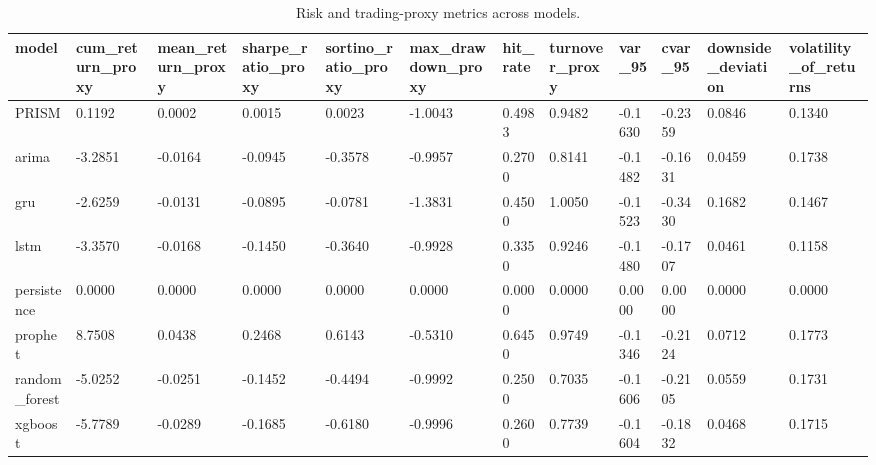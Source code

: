 \begin{table}[htbp]
\centering
\begin{tabular}{llllllllllll}
\hline
model & cum_return_proxy & mean_return_proxy & sharpe_ratio_proxy & sortino_ratio_proxy & max_drawdown_proxy & hit_rate & turnover_proxy & var_95 & cvar_95 & downside_deviation & volatility_of_returns \\
\hline
PRISM & 0.1192 & 0.0002 & 0.0015 & 0.0023 & -1.0043 & 0.4983 & 0.9482 & -0.1630 & -0.2359 & 0.0846 & 0.1340 \\
arima & -3.2851 & -0.0164 & -0.0945 & -0.3578 & -0.9957 & 0.2700 & 0.8141 & -0.1482 & -0.1631 & 0.0459 & 0.1738 \\
gru & -2.6259 & -0.0131 & -0.0895 & -0.0781 & -1.3831 & 0.4500 & 1.0050 & -0.1523 & -0.3430 & 0.1682 & 0.1467 \\
lstm & -3.3570 & -0.0168 & -0.1450 & -0.3640 & -0.9928 & 0.3350 & 0.9246 & -0.1480 & -0.1707 & 0.0461 & 0.1158 \\
persistence & 0.0000 & 0.0000 & 0.0000 & 0.0000 & 0.0000 & 0.0000 & 0.0000 & 0.0000 & 0.0000 & 0.0000 & 0.0000 \\
prophet & 8.7508 & 0.0438 & 0.2468 & 0.6143 & -0.5310 & 0.6450 & 0.9749 & -0.1346 & -0.2124 & 0.0712 & 0.1773 \\
random_forest & -5.0252 & -0.0251 & -0.1452 & -0.4494 & -0.9992 & 0.2500 & 0.7035 & -0.1606 & -0.2105 & 0.0559 & 0.1731 \\
xgboost & -5.7789 & -0.0289 & -0.1685 & -0.6180 & -0.9996 & 0.2600 & 0.7739 & -0.1604 & -0.1832 & 0.0468 & 0.1715 \\
\hline
\end{tabular}
\caption{Risk and trading-proxy metrics across models.}
\label{table_risk_adjusted_metrics}
\end{table}
